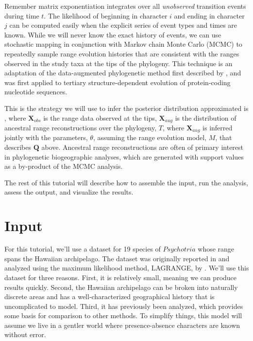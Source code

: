 \documentclass[11pt]{article}
\begin{document}
Remember matrix exponentiation integrates over all \textit{unobserved} transition events during time $t$.
The likelihood of beginning in character $i$ and ending in character $j$ can be computed easily when the explicit series of event types and times are known.
While we will never know the exact history of events, we can use stochastic mapping in conjunction with Markov chain Monte Carlo (MCMC) to repeatedly sample range evolution histories that are consistent with the ranges observed in the study taxa at the tips of the phylogeny.
This technique is an adaptation of the data-augmented phylogenetic method first described by \citet{robinson03}, and was first applied to tertiary structure-dependent evolution of protein-coding nucleotide sequences.

This is the strategy we will use to infer the posterior distribution approximated is 
, where $\textbf{X}_{obs}$ is the range data observed at the tips, $\textbf{X}_{aug}$ is the distribution of ancestral range reconstructions over the phylogeny, $T$, where $\textbf{X}_{aug}$ is inferred jointly with the parameters, $\theta$, assuming the range evolution model, $M$, that describes $\textbf{Q}$ above.
Ancestral range reconstructions are often of primary interest in phylogenetic biogeographic analyses, which are generated with support values as a by-product of the MCMC analysis.

The rest of this tutorial will describe how to assemble the input, run the analysis, assess the output, and visualize the results.

\newpage

\section{Input}

For this tutorial, we'll use a dataset for 19 species of $Psychotria$ whose range spans the Hawaiian archipelago.
The dataset was originally reported in \citet{nepokroeff03} and analyzed using the maximum likelihood method, LAGRANGE, by \citet{ree08}.
We'll use this dataset for three reasons.
First, it is relatively small, meaning we can produce results quickly.
Second, the Hawaiian archipelago can be broken into naturally discrete areas and has a well-characterized geographical history that is uncomplicated to model.
Third, it has previously been analyzed, which provides some basis for comparison to other methods.
To simplify things, this model will assume we live in a gentler world where presence-absence characters are known without error.
\end{document}
